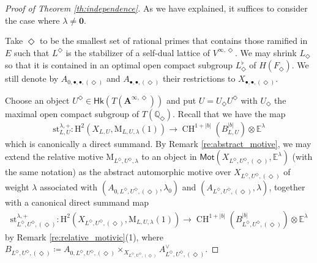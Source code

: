 \documentclass[12pt]{amsart}
\numberwithin{equation}{section}
\theoremstyle{plain}
\theoremstyle{definition}
\theoremstyle{remark}
\renewcommand{\b}[1]{\mathbf{#1}}
\renewcommand{\d}[1]{\mathbb{#1}}
\renewcommand{\r}[1]{\mathrm{#1}}
\renewcommand{\sf}[1]{\mathsf{#1}}
\renewcommand{\(}{\left(}
\renewcommand{\)}{\right)}
\newcommand{\bA}{\b A}
\newcommand{\dE}{\d E}
\newcommand{\dQ}{\d Q}
\newcommand{\rH}{\r H}
\newcommand{\rM}{\r M}
\newcommand{\st}{\r{st}}
\newcommand{\Hk}{\sf{Hk}}
\newcommand{\Mot}{\sf{Mot}}
\DeclareMathOperator{\CH}{CH}
\begin{document}
\begin{proof}[Proof of Theorem \ref{th:independence}]
As we have explained, it suffices to consider the case where $\lambda\neq\b{0}$.

Take $\Diamond$ to be the smallest set of rational primes that contains those ramified in $E$ such that $L^\Diamond$ is the stabilizer of a self-dual lattice of $V^{\infty,\Diamond}$. We may shrink $L_\Diamond$ so that it is contained in an optimal open compact subgroup $L^\flat_\Diamond$ of $H(F_\Diamond)$. We still denote by $A_{0,\bullet,\bullet,(\Diamond)}$ and $A_{\bullet,\bullet,(\Diamond)}$ their restrictions to $X_{\bullet,\bullet,(\Diamond)}$.

Choose an object $U^\Diamond\in\Hk(T(\bA^{\infty,\Diamond}))$ and put $U=U_\Diamond U^\Diamond$ with $U_\Diamond$ the maximal open compact subgroup of $T(\dQ_\Diamond)$. Recall that we have the map
\[
\st_{L,U}^{\lambda,+}\colon\rH^2(X_{L,U},\rM_{L,U,\lambda}(1))
\to\CH^{1+|b|}(B_{L,U}^{|b|})\otimes\dE^\lambda
\]
which is canonically a direct summand. By Remark \ref{re:abstract_motive}, we may extend the relative motive $\rM_{L^\Diamond,U^\Diamond,\lambda}$ to an object in $\Mot(X_{L^\Diamond,U^\Diamond,(\Diamond)},\dE^\lambda)$ (with the same notation) as the abstract automorphic motive over $X_{L^\Diamond,U^\Diamond,(\Diamond)}$ of weight $\lambda$ associated with $(A_{0,L^\Diamond,U^\Diamond,(\Diamond)},\lambda_0)$ and $(A_{L^\Diamond,U^\Diamond,(\Diamond)},\lambda)$, together with a canonical direct summand map
\begin{align}\label{eq:independence}
\st_{L^\Diamond,U^\Diamond,(\Diamond)}^{\lambda,+}\colon\rH^2(X_{L^\Diamond,U^\Diamond,(\Diamond)},\rM_{L,U,\lambda}(1))
\to\CH^{1+|b|}(B_{L^\Diamond,U^\Diamond,(\Diamond)}^{|b|})\otimes\dE^\lambda
\end{align}
by Remark \ref{re:relative_motivic}(1), where $B_{L^\Diamond,U^\Diamond,(\Diamond)}\coloneqq A_{0,L^\Diamond,U^\Diamond,(\Diamond)}\times_{X_{L^\Diamond,U^\Diamond,(\Diamond)}}A_{L^\Diamond,U^\Diamond,(\Diamond)}^\vee$.


\end{proof}
\end{document}
